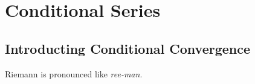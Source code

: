 
\chapter{Conditional Series}



\section{Introducting Conditional Convergence}


Riemann is pronounced like \textit{ree-man}. 